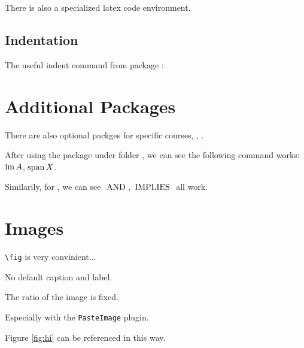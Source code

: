 \documentclass[12pt, orange, night, 0.5in]{alittlebear}
\begin{document}
There is also a specialized latex code environment.

\begin{latexcode}
\end{latexcode}

\subsection{Indentation}

The useful indent command from package :



\np
\section{Additional Packages}

There are also optional packges for specific courses, \eg, .

After using the  package under folder , we can see the following command works: $\operatorname{im} A$, $\operatorname{span} X$.

Similarily, for , we can see $\,\,\mathrm{AND}\,\,, \,\,\mathrm{IMPLIES}\,\,$ all work.

\np
\section{Images}

\verb=\fig= is very convinient...


No default caption and label.


The ratio of the image is fixed.



Especially with the \verb=PasteImage= plugin. 

Figure \ref{fig:hi} can be referenced in this way.
\end{document}
